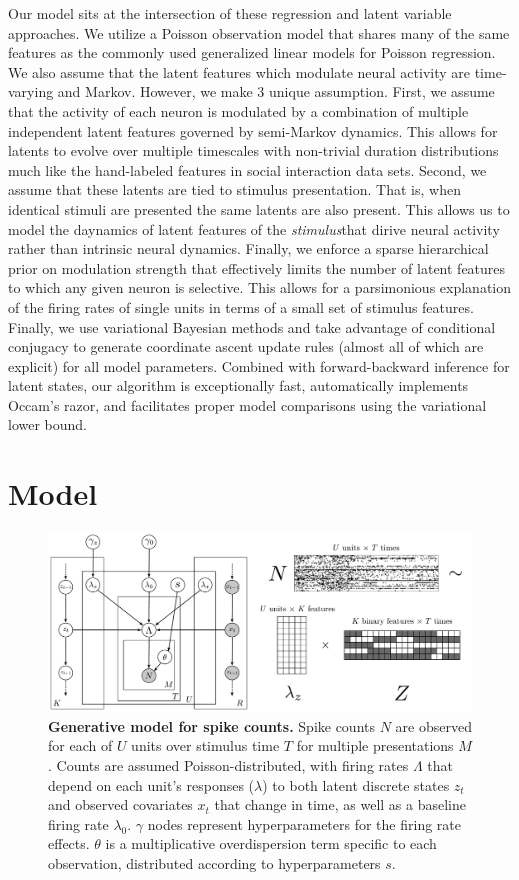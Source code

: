\documentclass{article} %
\begin{document}
Our model sits at the intersection of these regression and latent variable approaches. We utilize a Poisson observation model that shares many of the same features as the commonly used generalized linear models for Poisson regression. We also assume that the latent features which modulate neural activity are time-varying and Markov. However, we make 3 unique assumption. First, we assume that the activity of each neuron is modulated by a combination of multiple independent latent features governed by semi-Markov dynamics.  This allows for latents to evolve over multiple timescales with non-trivial duration distributions much like the hand-labeled features in social interaction data sets. Second, we assume that these latents are tied to stimulus presentation.  That is, when identical stimuli are presented the same latents are also present.  This allows us to model the daynamics of latent features of the \emph{stimulus}that dirive neural activity rather than intrinsic neural dynamics.  Finally, we enforce a sparse hierarchical prior on modulation strength that effectively limits the number of latent features to which any given neuron is selective. This allows for a parsimonious explanation of the firing rates of single units in terms of a small set of stimulus features. Finally, we use variational Bayesian methods and take advantage of conditional conjugacy to generate coordinate ascent update rules (almost all of which are explicit) for all model parameters. Combined with forward-backward inference for latent states, our algorithm is exceptionally fast, automatically implements Occam's razor, and facilitates proper model comparisons using the variational lower bound.

\section{Model}
\label{model_sec}
\begin{figure}[ht]
    \includegraphics[width=1\linewidth]{figures/model}
    \caption{\textbf{Generative model for spike counts.} Spike counts $N$ are observed for each of $U$ units over stimulus time $T$ for multiple presentations $M$. Counts are assumed Poisson-distributed, with firing rates $\Lambda$ that depend on each unit's responses ($\lambda$) to both latent discrete states $z_t$ and observed covariates $x_t$ that change in time, as well as a baseline firing rate $\lambda_0$. $\gamma$ nodes represent hyperparameters for the firing rate effects. $\theta$ is a multiplicative overdispersion term specific to each observation, distributed according to hyperparameters $s$.}
\end{figure}
\end{document}
